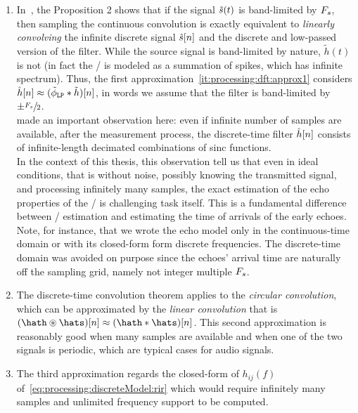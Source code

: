 \begin{enumerate}[label=(\roman*)]
    \item\label{it:processing:dft:approx1}
    In~, the Proposition 2 shows that if the signal $\tilde{s}(t)$ is band-limited by $F_s$,
    then sampling the continuous convolution is exactly equivalent to \textit{linearly convolving} the infinite discrete signal $\hat{s}[n]$ and the discrete and low-passed version of the filter.
    While the source signal is band-limited by nature, $\tilde{h}(t)$ is not (in fact the \RIR/ is modeled as a summation of spikes, which has infinite spectrum).
    Thus, the first approximation~\ref{it:processing:dft:approx1} considers $\hat{h}[n] \approx (\lowpassfilter \convDis \tilde{h})[n]$, in words
    we assume that the filter is band-limited by $\pm \sfrac{F_s}{2}$.
    \\\citeauthor{tukuljac2018mulan} made an important observation here:
    even if infinite number of samples are available, after the measurement process, the discrete-time filter $\hat{h}[n]$ consists of infinite-length decimated combinations of sinc functions.
    \\In the context of this thesis, this observation tell us that even in ideal conditions, that is without noise, possibly knowing the transmitted signal, and processing infinitely
    many samples, the exact estimation of the echo properties of the \RIR/ is challenging task itself. This is a fundamental difference between \RIR/ estimation and estimating the
    time of arrivals of the early echoes.
    \\Note, for instance, that we wrote the echo model only in the continuous-time domain or with its closed-form form discrete frequencies.
    The discrete-time domain was avoided on purpose since the echoes' arrival time are naturally off the sampling grid, namely not integer multiple $F_s$.

    \item\label{it:processing:dft:approx2}
    The discrete-time convolution theorem applies to the \textit{circular convolution}, which can be approximated by the \textit{linear convolution}
    that is $(\hath \circledast \hats)[n] \approx (\hath \convDis \hats)[n]$.
    This second approximation is reasonably good when many samples are available and when one of the two signals is periodic, which
    are typical cases for audio signals.

    \item\label{it:processing:dft:approx3}
    The third approximation regards the closed-form of $h_{ij}(f)$ of~\cref{eq:processing:discreteModel:rir} which
    would require infinitely many samples and unlimited frequency support to be computed.
\end{enumerate}

